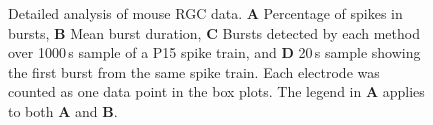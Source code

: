 \documentclass[12pt, titlepage]{article}
\begin{document}
		\begin{figure}[h]
			\centering
			\caption{Detailed analysis of mouse RGC data. \textbf{A} Percentage of spikes in bursts, \textbf{B} Mean burst duration, \textbf{C} Bursts detected by each method over 1000$\,$s sample of a P15 spike train, and \textbf{D} 20$\,$s sample showing the first burst from the same spike train. Each electrode was counted as one data point in the box plots. The legend in \textbf{A} applies to both \textbf{A} and \textbf{B}.}
			\label{RGC_results}
		\end{figure}
\end{document}
